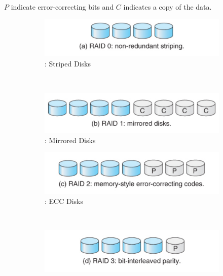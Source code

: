 $P$ indicate error-correcting bits and $C$ indicates a copy of the data.
\begin{figure}[h!tbp]
  \centering
  \begin{subfigure}{1.0\linewidth}
    \centering
    \includegraphics[scale=1.00]{./Drawings/EDAF35-Operating_Systems/RAID_0.png}
    \caption{: Striped Disks}
    \label{subfig:RAID_0}
  \end{subfigure} \\
  \begin{subfigure}{0.45\linewidth}
    \centering
    \includegraphics[scale=1.00]{./Drawings/EDAF35-Operating_Systems/RAID_1.png}
    \caption{: Mirrored Disks}
    \label{subfig:RAID_1}
  \end{subfigure}
  \begin{subfigure}{0.45\linewidth}
    \centering
    \includegraphics[scale=1.00]{./Drawings/EDAF35-Operating_Systems/RAID_2.png}
    \caption{: ECC Disks}
    \label{subfig:RAID_2}
  \end{subfigure} \\
  \begin{subfigure}{0.45\linewidth}
    \centering
    \includegraphics[scale=1.00]{./Drawings/EDAF35-Operating_Systems/RAID_3.png}

\end{subfigure}
\end{figure}
